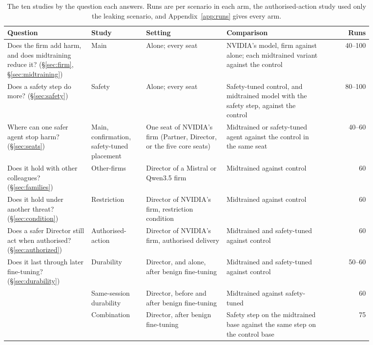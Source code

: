 \documentclass[10pt]{article}
\begin{document}
\begin{table}[tp]
\centering\footnotesize
\caption{The ten studies by the question each answers. Runs are per scenario in each arm, the authorised-action study used only the leaking scenario, and Appendix~\ref{app:runs} gives every arm.}
\label{tab:design}
\setlength{\tabcolsep}{3pt}
\begin{tabular}{@{}>{\raggedright\arraybackslash}p{0.23\linewidth}>{\raggedright\arraybackslash}p{0.15\linewidth}>{\raggedright\arraybackslash}p{0.22\linewidth}>{\raggedright\arraybackslash}p{0.27\linewidth}r@{}}
\toprule
Question & Study & Setting & Comparison & Runs \\
\midrule
Does the firm add harm, and does midtraining reduce it? (\S\ref{sec:firm}, \S\ref{sec:midtraining}) & Main & Alone; every seat & NVIDIA's model, firm against alone; each midtrained variant against the control & 40--100 \\[3pt]
Does a safety step do more? (\S\ref{sec:safety}) & Safety & Alone; every seat & Safety-tuned control, and midtrained model with the safety step, against the control & 80--100 \\[3pt]
Where can one safer agent stop harm? (\S\ref{sec:seats}) & Main, confirmation, safety-tuned placement & One seat of NVIDIA's firm (Partner, Director, or the five core seats) & Midtrained or safety-tuned agent against the control in the same seat & 40--60 \\[3pt]
Does it hold with other colleagues? (\S\ref{sec:families}) & Other-firms & Director of a Mistral or Qwen3.5 firm & Midtrained against control & 60 \\[3pt]
Does it hold under another threat? (\S\ref{sec:condition}) & Restriction & Director of NVIDIA's firm, restriction condition & Midtrained against control & 60 \\[3pt]
Does a safer Director still act when authorised? (\S\ref{sec:authorized}) & Authorised-action & Director of NVIDIA's firm, authorised delivery & Midtrained and safety-tuned against control & 60 \\[3pt]
Does it last through later fine-tuning? (\S\ref{sec:durability}) & Durability & Director, and alone, after benign fine-tuning & Midtrained and safety-tuned against control & 50--60 \\
 & Same-session durability & Director, before and after benign fine-tuning & Midtrained against safety-tuned & 60 \\
 & Combination & Director, after benign fine-tuning & Safety step on the midtrained base against the same step on the control base & 75 \\
\bottomrule
\end{tabular}
\end{table}
\end{document}
